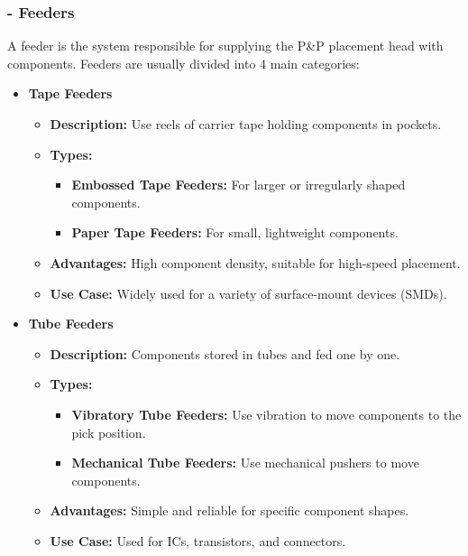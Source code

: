 \documentclass[a4paper,10pt]{report}
\begin{document}
\subsubsection{- Feeders}
A feeder is the system responsible for supplying the P\&P placement head with components. Feeders are usually divided into 4 main categories:
\begin{itemize}
    \item \textbf{Tape Feeders}
    \begin{itemize}
        \item \textbf{Description:} Use reels of carrier tape holding components in pockets.
        \item \textbf{Types:}
        \begin{itemize}
            \item \textbf{Embossed Tape Feeders:} For larger or irregularly shaped components.
            \item \textbf{Paper Tape Feeders:} For small, lightweight components.
        \end{itemize}
        \item \textbf{Advantages:} High component density, suitable for high-speed placement.
        \item \textbf{Use Case:} Widely used for a variety of surface-mount devices (SMDs).
    \end{itemize}

    \item \textbf{Tube Feeders}
    \begin{itemize}
        \item \textbf{Description:} Components stored in tubes and fed one by one.
        \item \textbf{Types:}
        \begin{itemize}
            \item \textbf{Vibratory Tube Feeders:} Use vibration to move components to the pick position.
            \item \textbf{Mechanical Tube Feeders:} Use mechanical pushers to move components.
        \end{itemize}
        \item \textbf{Advantages:} Simple and reliable for specific component shapes.
        \item \textbf{Use Case:} Used for ICs, transistors, and connectors.
    \end{itemize}


\end{itemize}
\end{document}
